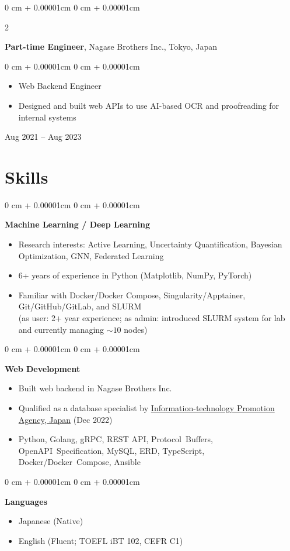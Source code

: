 \documentclass[11pt, letterpaper]{article}
\newenvironment{highlights}{
    \begin{itemize}[
        topsep=0.0cm,
        parsep=0.0cm,
        partopsep=0pt,
        itemsep=0pt,
        leftmargin=10pt
    ]
}{
    \end{itemize}
} %
\newenvironment{highlightsforbulletentries}{
    \begin{itemize}[
        topsep=0.0cm,
        parsep=0.0cm,
        partopsep=0pt,
        itemsep=0pt,
        leftmargin=10pt
    ]
}{
    \end{itemize}
} %
\newenvironment{onecolentry}{
    \begin{adjustwidth}{
        0 cm + 0.00001cm
    }{
        0 cm + 0.00001cm
    }
}{
    \end{adjustwidth}
} %
\newenvironment{twocolentry}[2][]{
    \onecolentry
    \def\secondColumn{#2}
    \setcolumnwidth{\fill, 3.5cm}
    \begin{paracol}{2}
}{
    \switchcolumn \raggedleft \secondColumn
    \end{paracol}
    \endonecolentry
} %
\begin{document}
    \vspace{0.25cm}
    \begin{twocolentry}{Aug 2021 -- Aug 2023}
      \textbf{Part-time Engineer}, Nagase Brothers Inc., Tokyo, Japan
      \vspace{0.10 cm}
      \begin{onecolentry}
        \begin{highlights}
          \item Web Backend Engineer
          \item Designed and built web APIs to use AI-based OCR and proofreading for internal systems
        \end{highlights}
      \end{onecolentry}
    \end{twocolentry}

    \section{Skills}
      \begin{onecolentry}
        \textbf{Machine Learning / Deep Learning}
        \begin{highlightsforbulletentries}
          \item Research interests: Active Learning, Uncertainty Quantification, Bayesian Optimization, GNN, Federated Learning
          \item 6+ years of experience in Python (Matplotlib, NumPy, PyTorch)
          \item Familiar with Docker/Docker Compose, Singularity/Apptainer, Git/GitHub/GitLab, and SLURM \\(as user: 2+ year experience; as admin: introduced SLURM system for lab and currently managing \(\sim 10\) nodes)
        \end{highlightsforbulletentries}
      \end{onecolentry}
      \vspace{0.10 cm}
      \begin{onecolentry}
        \textbf{Web Development}
        \begin{highlightsforbulletentries}
          \item Built web backend in Nagase Brothers Inc.
          \item Qualified as a database specialist by \href{https://www.ipa.go.jp/en/}{Information-technology Promotion Agency, Japan} (Dec 2022)
          \item Python, Golang, gRPC, REST API, Protocol~Buffers, OpenAPI~Specification, MySQL, ERD, TypeScript, Docker/Docker~Compose, Ansible
        \end{highlightsforbulletentries}
      \end{onecolentry}
      \vspace{0.10 cm}
      \begin{onecolentry}
        \textbf{Languages}
        \begin{highlightsforbulletentries}
          \item Japanese (Native)
          \item English (Fluent; TOEFL iBT 102, CEFR C1)
        \end{highlightsforbulletentries}
      \end{onecolentry}
\end{document}
